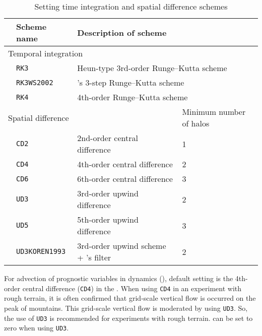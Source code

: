 \begin{table}[bth]
\begin{center}
  \caption{Setting time integration and spatial difference schemes}
  \label{tab:nml_atm_dyn}
  \begin{tabularx}{150mm}{llXX} \hline
    \rowcolor[gray]{0.9} & \multicolumn{1}{l}{Scheme name} & \multicolumn{1}{l}{Description of scheme} & \\ \hline
    \multicolumn{3}{l}{Temporal integration} &  \\ \hline
    & \multicolumn{1}{l}{\verb|RK3|} & \multicolumn{2}{l}{Heun-type 3rd-order Runge--Kutta scheme} \\
    & \multicolumn{1}{l}{\verb|RK3WS2002|} & \multicolumn{2}{l}{\citet{Wicker_2002}'s 3-step Runge--Kutta scheme} \\
    & \multicolumn{1}{l}{\verb|RK4|} & \multicolumn{2}{l}{4th-order Runge--Kutta scheme} \\
    \hline
    \multicolumn{3}{l}{Spatial difference} & Minimum number of halos\\ \hline
    & \multicolumn{1}{l}{\verb|CD2|} & \multicolumn{1}{l}{2nd-order central difference} & \multicolumn{1}{l}{1}\\
    & \multicolumn{1}{l}{\verb|CD4|} & \multicolumn{1}{l}{4th-order central difference} & \multicolumn{1}{l}{2}\\
    & \multicolumn{1}{l}{\verb|CD6|} & \multicolumn{1}{l}{6th-order central difference} & \multicolumn{1}{l}{3}\\
    & \multicolumn{1}{l}{\verb|UD3|} & \multicolumn{1}{l}{3rd-order upwind difference} & \multicolumn{1}{l}{2}\\
    & \multicolumn{1}{l}{\verb|UD5|} & \multicolumn{1}{l}{5th-order upwind difference} & \multicolumn{1}{l}{3}\\
    & \multicolumn{1}{l}{\verb|UD3KOREN1993|} & \multicolumn{1}{X}{3rd-order upwind scheme + \citet{Koren_1993}'s filter} & \multicolumn{1}{l}{2}\\
\hline
  \end{tabularx}
\end{center}
\end{table}

For advection of prognostic variables in dynamics (),
default setting is the 4th-order central difference (\verb|CD4|) in the \scalerm.
When using \verb|CD4| in an experiment with rough terrain,
it is often confirmed that grid-scale vertical flow is occurred on the peak of mountains.
This grid-scale vertical flow is moderated by using \verb|UD3|.
So, the use of \verb|UD3| is recommended for experiments with rough terrain.
 can be set to zero when using \verb|UD3|.

